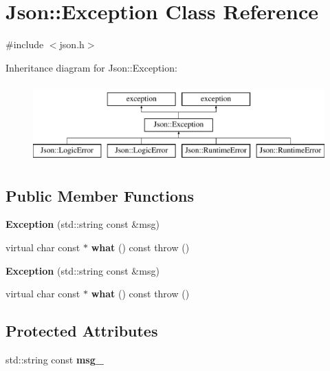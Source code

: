 \section{Json\+:\+:Exception Class Reference}
\label{class_json_1_1_exception}


{\ttfamily \#include $<$json.\+h$>$}

Inheritance diagram for Json\+:\+:Exception\+:\begin{figure}[H]
\begin{center}
\leavevmode
\includegraphics[height=3.000000cm]{class_json_1_1_exception}
\end{center}
\end{figure}
\subsection*{Public Member Functions}
\begin{DoxyCompactItemize}
\item 
{\bfseries Exception} (std\+::string const \&msg)\label{class_json_1_1_exception_a4dd1b9f007bed842e3ef9883d965fe22}

\item 
virtual char const $\ast$ {\bfseries what} () const   throw ()\label{class_json_1_1_exception_a93032b715e86fc37ad318c60eac4cad7}

\item 
{\bfseries Exception} (std\+::string const \&msg)\label{class_json_1_1_exception_a4dd1b9f007bed842e3ef9883d965fe22}

\item 
virtual char const $\ast$ {\bfseries what} () const   throw ()\label{class_json_1_1_exception_a49708f583127d4190f9e3806ac8e8eff}

\end{DoxyCompactItemize}
\subsection*{Protected Attributes}
\begin{DoxyCompactItemize}
\item 
std\+::string const {\bfseries msg\+\_\+}\label{class_json_1_1_exception_a6457bfa979e1bba636ba34605203f6a0}

\end{DoxyCompactItemize}


